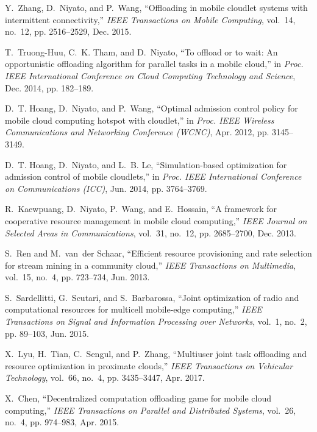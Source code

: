 \documentclass[10pt,journal,compsoc]{IEEEtran}
\begin{document}
{\begin{thebibliography}{10}
Y.~Zhang, D.~Niyato, and P.~Wang, ``Offloading in mobile cloudlet systems with
  intermittent connectivity,'' \emph{IEEE Transactions on Mobile Computing},
  vol.~14, no.~12, pp. 2516--2529, Dec. 2015.

T.~Truong-Huu, C.~K. Tham, and D.~Niyato, ``To offload or to wait: An
  opportunistic offloading algorithm for parallel tasks in a mobile cloud,'' in
  \emph{Proc. IEEE International Conference on Cloud Computing Technology and
  Science}, Dec. 2014, pp. 182--189.

D.~T. Hoang, D.~Niyato, and P.~Wang, ``Optimal admission control policy for
  mobile cloud computing hotspot with cloudlet,'' in \emph{Proc. IEEE Wireless
  Communications and Networking Conference (WCNC)}, Apr. 2012, pp. 3145--3149.

D.~T. Hoang, D.~Niyato, and L.~B. Le, ``Simulation-based optimization for
  admission control of mobile cloudlets,'' in \emph{Proc. IEEE International
  Conference on Communications (ICC)}, Jun. 2014, pp. 3764--3769.

R.~Kaewpuang, D.~Niyato, P.~Wang, and E.~Hossain, ``A framework for cooperative
  resource management in mobile cloud computing,'' \emph{IEEE Journal on
  Selected Areas in Communications}, vol.~31, no.~12, pp. 2685--2700, Dec.
  2013.

S.~Ren and M.~van~der Schaar, ``Efficient resource provisioning and rate
  selection for stream mining in a community cloud,'' \emph{IEEE Transactions
  on Multimedia}, vol.~15, no.~4, pp. 723--734, Jun. 2013.

S.~Sardellitti, G.~Scutari, and S.~Barbarossa, ``Joint optimization of radio
  and computational resources for multicell mobile-edge computing,'' \emph{IEEE
  Transactions on Signal and Information Processing over Networks}, vol.~1,
  no.~2, pp. 89--103, Jun. 2015.

X.~Lyu, H.~Tian, C.~Sengul, and P.~Zhang, ``Multiuser joint task offloading and
  resource optimization in proximate clouds,'' \emph{IEEE Transactions on
  Vehicular Technology}, vol.~66, no.~4, pp. 3435--3447, Apr. 2017.

X.~Chen, ``Decentralized computation offloading game for mobile cloud
  computing,'' \emph{IEEE Transactions on Parallel and Distributed Systems},
  vol.~26, no.~4, pp. 974--983, Apr. 2015.


\end{thebibliography}}
\end{document}
